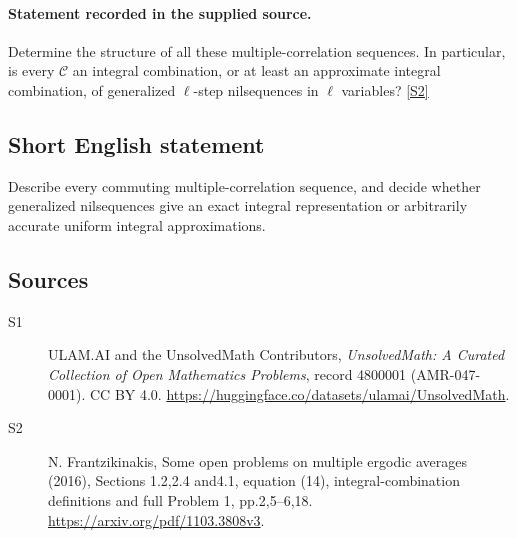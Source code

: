 \documentclass[11pt]{article}
\newcommand{\sref}[2]{\hyperlink{source:#1:#2}{[S#2]}}
\begin{document}
\paragraph{Statement recorded in the supplied source.}
Determine the structure of all these multiple-correlation sequences. In particular, is every $\mathcal C$ an integral combination, or at least an approximate integral combination, of generalized $\ell$-step nilsequences in $\ell$ variables? \sref{4800001}{2}
\subsection{Short English statement}
Describe every commuting multiple-correlation sequence, and decide whether generalized nilsequences give an exact integral representation or arbitrarily accurate uniform integral approximations.
\subsection{Sources}
\begin{description}
\item[\hypertarget{source:4800001:1}{S1}] ULAM.AI and the UnsolvedMath Contributors, \emph{UnsolvedMath: A Curated Collection of Open Mathematics Problems}, record 4800001 (AMR-047-0001). CC BY 4.0. \url{https://huggingface.co/datasets/ulamai/UnsolvedMath}.
\item[\hypertarget{source:4800001:2}{S2}] N. Frantzikinakis, Some open problems on multiple ergodic averages (2016), Sections 1.2,2.4 and4.1, equation (14), integral-combination definitions and full Problem 1, pp.2,5--6,18. \url{https://arxiv.org/pdf/1103.3808v3}.
\end{description}
\label{end:4800001}
\end{document}
